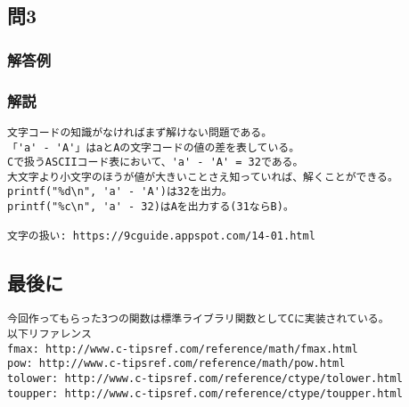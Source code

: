 \subsection{問3}
\subsubsection{解答例}

\subsubsection{解説}
\begin{verbatim}
文字コードの知識がなければまず解けない問題である。
「'a' - 'A'」はaとAの文字コードの値の差を表している。
Cで扱うASCIIコード表において、'a' - 'A' = 32である。
大文字より小文字のほうが値が大きいことさえ知っていれば、解くことができる。
printf("%d\n", 'a' - 'A')は32を出力。
printf("%c\n", 'a' - 32)はAを出力する(31ならB)。

文字の扱い: https://9cguide.appspot.com/14-01.html
\end{verbatim}

\subsection{最後に}
\begin{verbatim}
今回作ってもらった3つの関数は標準ライブラリ関数としてCに実装されている。
以下リファレンス
fmax: http://www.c-tipsref.com/reference/math/fmax.html
pow: http://www.c-tipsref.com/reference/math/pow.html
tolower: http://www.c-tipsref.com/reference/ctype/tolower.html
toupper: http://www.c-tipsref.com/reference/ctype/toupper.html

\end{verbatim}
